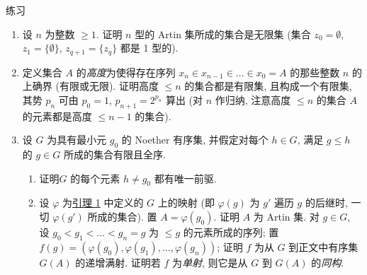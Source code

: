 \hypertarget{sga4.exp.I.appendix.II.sec.7.exercises}{}
\begin{enonce*}[remark]{练习}
\begin{enumerate}
\renewcommand{\labelenumi}{\theenumi)}
\hypertarget{sga4.exp.I.appendix.II.sec.7.exercise.1}{}
\item 设 $n$ 为整数 $\geq 1$. 证明 $n$ 型的 Artin 集所成的集合是无限集 (集合 $z_0=∅$, $z_1=\{∅\}$, $z_{q+1}=\{z_q\}$ 都是 1 型的).

\hypertarget{sga4.exp.I.appendix.II.sec.7.exercise.2}{}
\item 定义集合 $A$ 的\emph{高度}为使得存在序列 $x_n\in x_{n-1}\in \ldots \in x_0=A$ 的那些整数 $n$ 的上确界 (有限或无限). 证明高度 $\leq n$ 的集合都是有限集, 且构成一个有限集, 其势 $p_n$ 可由 $p_0=1$, $p_{n+1}=2^{p_n}$ 算出 (对 $n$ 作归纳, 注意高度 $\leq n$ 的集合 $A$ 的元素都是高度 $\leq n-1$ 的集合).

\hypertarget{sga4.exp.I.appendix.II.sec.7.exercise.3}{}
\item 设 $G$ 为具有最小元 $g_0$ 的 Noether 有序集, 并假定对每个 $h\in G$, 满足 $g\leq h$ 的 $g\in G$ 所成的集合有限且全序.
\begin{enumerate}
\renewcommand{\theenumii}{\alph{enumii}}
\renewcommand{\labelenumii}{\theenumii)}
\hypertarget{sga4.exp.I.appendix.II.sec.7.exercise.3.part.a}{}
\item 证明\pageoriginale $G$ 的每个元素 $h\neq g_0$ 都有唯一前驱.

\hypertarget{sga4.exp.I.appendix.II.sec.7.exercise.3.part.b}{}
\item 设 $\varphi$ 为\hyperlink{sga4.exp.I.appendix.II.sec.6.lemma.1}{引理 1} 中定义的 $G$ 上的映射 (即 $\varphi(g)$ 为 $g'$ 遍历 $g$ 的后继时, 一切 $\varphi(g')$ 所成的集合). 置 $A=\varphi(g_0)$. 证明 $A$ 为 Artin 集. 对 $g\in G$, 设 $g_0<g_1<\ldots<g_n=g$ 为 $\leq g$ 的元素所成的序列; 置 $f(g)=(\varphi(g_0),\varphi(g_1),\ldots,\varphi(g_n))$; 证明 $f$ 为从 $G$ 到正文中有序集 $G(A)$ 的递增满射. 证明若 $f$ 为\emph{单射}, 则它是从 $G$ 到 $G(A)$ 的\emph{同构}.


\end{enumerate}
\end{enumerate}
\end{enonce*}
